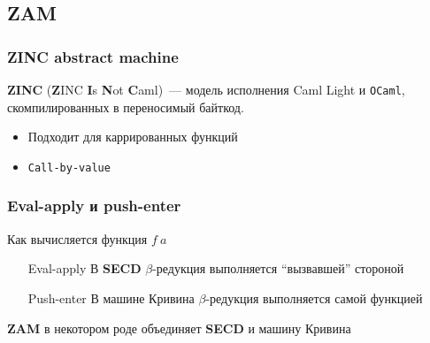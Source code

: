 \subsection{ZAM}
\begin{frame}
  \frametitle{ZINC abstract machine}
  \textbf{ZINC} (\textbf{Z}INC \textbf{I}s \textbf{N}ot \textbf{C}aml)~--- модель исполнения Caml Light и \texttt{OCaml}, скомпилированных в переносимый байткод.
  \begin{itemize}
    \item Подходит для каррированных функций
    \item \texttt{Call-by-value}
  \end{itemize}
\end{frame}

\begin{frame}%
  \frametitle{Eval-apply и push-enter}
  Как вычисляется функция $f \ a$
  \begin{itemize}
    \item[Eval-apply] В \textbf{SECD} $\beta$-редукция выполняется \enquote{вызвавшей} стороной
    \item[Push-enter] В машине Кривина $\beta$-редукция выполняется самой функцией
  \end{itemize}
  \textbf{ZAM} в некотором роде объединяет \textbf{SECD} и машину Кривина

\end{frame}

